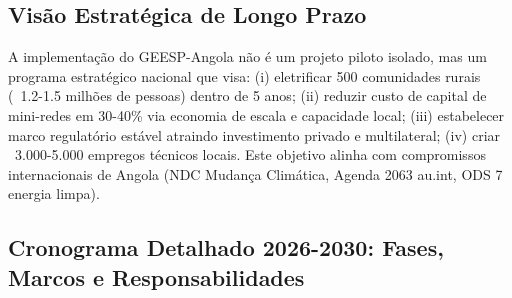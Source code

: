 \documentclass[12pt, a4paper]{article}
\begin{document}
\subsection{Visão Estratégica de Longo Prazo}

A implementação do GEESP-Angola não é um projeto piloto isolado, mas um programa estratégico nacional que visa: (i) eletrificar 500 comunidades rurais (~1.2-1.5 milhões de pessoas) dentro de 5 anos; (ii) reduzir custo de capital de mini-redes em 30-40\% via economia de escala e capacidade local; (iii) estabelecer marco regulatório estável atraindo investimento privado e multilateral; (iv) criar ~3.000-5.000 empregos técnicos locais. Este objetivo alinha com compromissos internacionais de Angola (NDC Mudança Climática, Agenda 2063 au.int, ODS 7 energia limpa).

\subsection{Cronograma Detalhado 2026-2030: Fases, Marcos e Responsabilidades}
\end{document}
